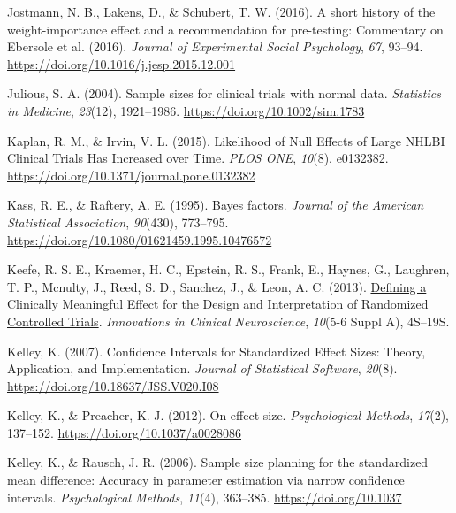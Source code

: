 \documentclass[
  oneside]{krantz}
\newlength{\cslhangindent}
\newlength{\cslentryspacingunit} %
\newenvironment{CSLReferences}[2] %
 {%
  \setlength{\parindent}{0pt}
  \ifodd #1
  \let\oldpar\par
  \def\par{\hangindent=\cslhangindent\oldpar}
  \fi
  \setlength{\parskip}{#2\cslentryspacingunit}
 }%
 {}
\begin{document}
\begin{CSLReferences}{1}{0}
\leavevmode{}%
Jostmann, N. B., Lakens, D., \& Schubert, T. W. (2016). A short history
of the weight-importance effect and a recommendation for pre-testing:
{Commentary} on {Ebersole} et al. (2016). \emph{Journal of Experimental
Social Psychology}, \emph{67}, 93--94.
\url{https://doi.org/10.1016/j.jesp.2015.12.001}

\leavevmode{}%
Julious, S. A. (2004). Sample sizes for clinical trials with normal
data. \emph{Statistics in Medicine}, \emph{23}(12), 1921--1986.
\url{https://doi.org/10.1002/sim.1783}

\leavevmode{}%
Kaplan, R. M., \& Irvin, V. L. (2015). Likelihood of {Null Effects} of
{Large NHLBI Clinical Trials Has Increased} over {Time}. \emph{PLOS
ONE}, \emph{10}(8), e0132382.
\url{https://doi.org/10.1371/journal.pone.0132382}

\leavevmode{}%
Kass, R. E., \& Raftery, A. E. (1995). Bayes factors. \emph{Journal of
the American Statistical Association}, \emph{90}(430), 773--795.
\url{https://doi.org/10.1080/01621459.1995.10476572}

\leavevmode{}%
Keefe, R. S. E., Kraemer, H. C., Epstein, R. S., Frank, E., Haynes, G.,
Laughren, T. P., Mcnulty, J., Reed, S. D., Sanchez, J., \& Leon, A. C.
(2013).
\href{https://www.ncbi.nlm.nih.gov/pmc/articles/PMC3719483}{Defining a
{Clinically Meaningful Effect} for the {Design} and {Interpretation} of
{Randomized Controlled Trials}}. \emph{Innovations in Clinical
Neuroscience}, \emph{10}(5-6 Suppl A), 4S--19S.

\leavevmode{}%
Kelley, K. (2007). Confidence {Intervals} for {Standardized Effect
Sizes}: {Theory}, {Application}, and {Implementation}. \emph{Journal of
Statistical Software}, \emph{20}(8).
\url{https://doi.org/10.18637/JSS.V020.I08}

\leavevmode{}%
Kelley, K., \& Preacher, K. J. (2012). On effect size.
\emph{Psychological Methods}, \emph{17}(2), 137--152.
\url{https://doi.org/10.1037/a0028086}

\leavevmode{}%
Kelley, K., \& Rausch, J. R. (2006). Sample size planning for the
standardized mean difference: Accuracy in parameter estimation via
narrow confidence intervals. \emph{Psychological Methods}, \emph{11}(4),
363--385. \url{https://doi.org/10.1037}


\end{CSLReferences}
\end{document}
